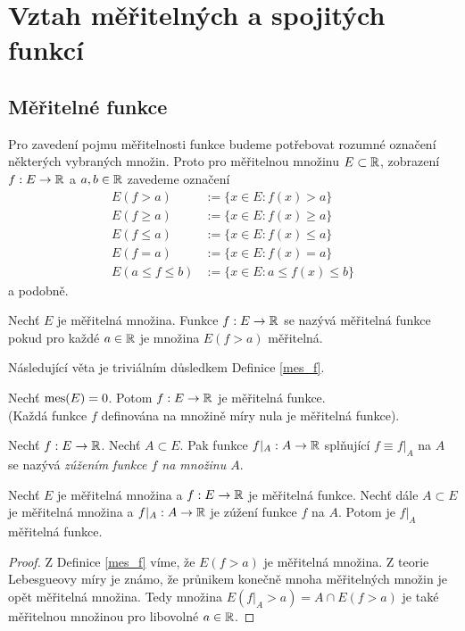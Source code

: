 
\chapter{Vztah měřitelných a spojitých funkcí}

\section{Měřitelné funkce}
Pro zavedení pojmu měřitelnosti funkce budeme potřebovat rozumné označení některých vybraných množin. Proto pro měřitelnou množinu $E \subset \mathbb{R}$, zobrazení $f: E \to \mathbb{R}$ a $a,b \in \mathbb{R}$ zavedeme označení
\begin{align*}
E(f>a)&:=\{x \in E: f(x)>a\} \\
E(f \geq a)&:=\{x \in E: f(x) \geq a\} \\
E(f \leq a)&:=\{x \in E: f(x) \leq a\} \\
E(f = a)&:=\{x \in E: f(x) = a\} \\
E(a \leq f  \leq b)&:=\{x \in E: a \leq f(x) \leq b\}
\end{align*}
a podobně.

\begin{definition}
\label{mes_f}
Nechť $E$ je měřitelná množina.
Funkce $f:E \to \mathbb{R}$ se nazývá měřitelná funkce pokud pro každé $a \in \mathbb{R}$ je množina $E(f>a)$ měřitelná.
\end{definition}
Následující věta je triviálním důsledkem Definice \ref{mes_f}.
\begin{theorem}
Nechť $\operatorname{mes}(E) = 0$.
Potom $f:E \to \mathbb{R}$ je měřitelná funkce. \\
(Každá funkce $f$ definována na množině míry nula je měřitelná funkce).
\end{theorem}

\begin{definition}
Nechť $f:E \to \mathbb{R}$. Nechť $A \subset E$. Pak funkce $f|_{A}:A \to \mathbb{R}$ splňující $f \equiv f|_{A}$ na $A$ se nazývá \textit{zúžením funkce $f$ na množinu $A$}. 
\end{definition}

\begin{theorem}
\label{v_zuzeni}
Nechť $E$ je měřitelná množina a $f:E \to \mathbb{R}$ je měřitelná funkce.
Nechť dále $A \subset E$ je měřitelná množina a $f|_{A}:A \to \mathbb{R}$ je zúžení funkce $f$ na $A$.
Potom je $f|_{A}$ měřitelná funkce.
\end{theorem}

\begin{proof}
Z Definice \ref{mes_f} víme, že $E(f>a)$ je měřitelná množina. Z teorie Lebesgueovy míry je známo, že pr\r unikem konečně mnoha měřitelných množin je opět měřitelná množina. Tedy množina $E(f|_{A}>a)=A \cap E(f>a)$ je také měřitelnou množinou pro libovolné $a \in \mathbb{R}$.
\end{proof}


